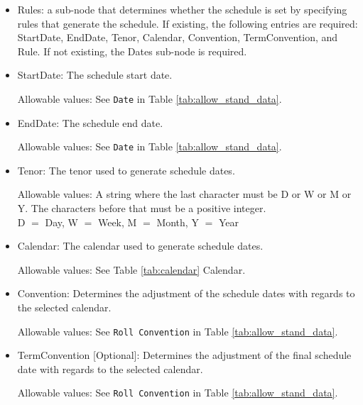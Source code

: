 \begin{itemize}
\item Rules: a sub-node that determines whether the schedule is set by specifying rules that
generate the schedule. If existing, the following entries are required: StartDate, EndDate, Tenor, Calendar, 
Convention, TermConvention, and Rule. If not existing, the Dates
sub-node is required.
\item StartDate:  The schedule start date.  

Allowable values:  See \lstinline!Date! in Table \ref{tab:allow_stand_data}.

\item EndDate: The schedule end date.  

Allowable values:  See \lstinline!Date! in Table \ref{tab:allow_stand_data}.

\item Tenor: The tenor used to generate schedule dates. 

Allowable values: A string where the last character must be D or W or
M or Y.  The characters before that must be a positive integer. \\D
$=$ Day, W $=$ Week, M $=$ Month, Y $=$ Year

\item Calendar: The calendar used to generate schedule  dates. 

Allowable values: See Table \ref{tab:calendar} Calendar.

\item Convention: Determines the adjustment of the schedule dates with
  regards to the selected calendar. 

Allowable values: See \lstinline!Roll Convention! in Table
\ref{tab:allow_stand_data}.

\item TermConvention [Optional]: Determines the adjustment of the final schedule
  date with regards to the selected calendar. 

Allowable values: See \lstinline!Roll Convention! in Table \ref{tab:allow_stand_data}.


\end{itemize}
